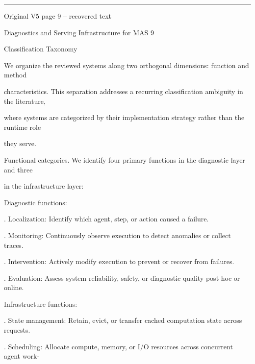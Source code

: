 \par\smallskip\noindent\rule{\textwidth}{0.4pt}\par{\sffamily\footnotesize Original V5 page 9 -- recovered text}\par\begin{flushleft}\footnotesize\ttfamily
\par\smallskip
\par\smallskip
\noindent Diagnostics and Serving Infrastructure for MAS 9\par
\par\smallskip
\par\smallskip
\par\smallskip
{} Classification Taxonomy\par
\noindent We organize the reviewed systems along two orthogonal dimensions: function and method\par
\noindent characteristics. This separation addresses a recurring classification ambiguity in the literature,\par
\noindent where systems are categorized by their implementation strategy rather than the runtime role\par
\noindent they serve.\par
\par\smallskip
\noindent Functional categories. We identify four primary functions in the diagnostic layer and three\par
\noindent in the infrastructure layer:\par
\noindent Diagnostic functions:\par
{}. Localization: Identify which agent, step, or action caused a failure.\par
{}. Monitoring: Continuously observe execution to detect anomalies or collect traces.\par
{}. Intervention: Actively modify execution to prevent or recover from failures.\par
{}. Evaluation: Assess system reliability, safety, or diagnostic quality post-hoc or online.\par
\noindent Infrastructure functions:\par
{}. State management: Retain, evict, or transfer cached computation state across requests.\par
{}. Scheduling: Allocate compute, memory, or I/O resources across concurrent agent work-\par

\end{flushleft}
